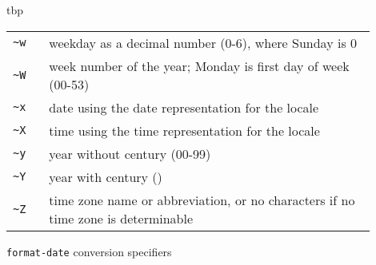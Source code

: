 \begin{desc}
\begin{boxedfigure}{tbp}
\begin{tabular}{l>{\raggedrightparbox}p{0.9\linewidth}}
      \verb|~w| &   weekday as a decimal number (0-6), where Sunday is 0 \\
      \verb|~W| &   week number of the year;
                    Monday is first day of week (00-53) \\
      \verb|~x| &   date using the date representation for the locale \\
      \verb|~X| &   time using the time representation for the locale \\
      \verb|~y| &   year without century (00-99) \\
      \verb|~Y| &   year with century (\eg 1990) \\
      \verb|~Z| &   time zone name or abbreviation, or no characters
                    if no time zone is determinable
    \end{tabular}

\caption{\texttt{format-date} conversion specifiers}
\label{fig:dateconv}
\end{boxedfigure}
\end{desc}
    
%
%
%

